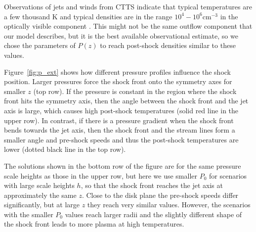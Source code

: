 \documentclass[manuscript]{aastex}
\begin{document}
Observations of jets and winds from CTTS indicate that typical temperatures are a few thousand K and typical densities are in the range $10^4-10^6 \mathrm{ cm}^{-3}$ in the optically visible component \citep[e.g.][]{2000A&A...356L..41L,2007ApJ...657..897K}. This might not be the same outflow component that our model describes, but it is the best available observational estimate, so we chose the parameters of $P(z)$ to reach post-shock densities similar to these values.

Figure~\ref{fig:p_ext} shows how different pressure profiles influence the shock position. Larger pressures force the shock front onto the symmetry axes for smaller $z$ (top row). If the pressure is constant in the region where the shock front hits the symmetry axis, then the angle between the shock front and the jet axis is large, which causes high post-shock temperatures (solid red line in the upper row). In contrast, if there is a pressure gradient when the shock front bends towards the jet axis, then the shock front and the stream lines form a smaller angle and pre-shock speeds and thus the post-shock temperatures are lower (dotted black line in the top row).

The solutions shown in the bottom row of the figure are for the same pressure scale heights as those in the upper row, but here we use smaller $P_0$ for scenarios with large scale heights $h$, so that the shock front reaches the jet axis at approximately the same $z$. Close to the disk plane the pre-shock speeds differ significantly, but at large $z$ they reach very similar values. However, the scenarios with the smaller $P_0$ values reach larger radii and the slightly different shape of the shock front leads to more plasma at high temperatures.
\end{document}
